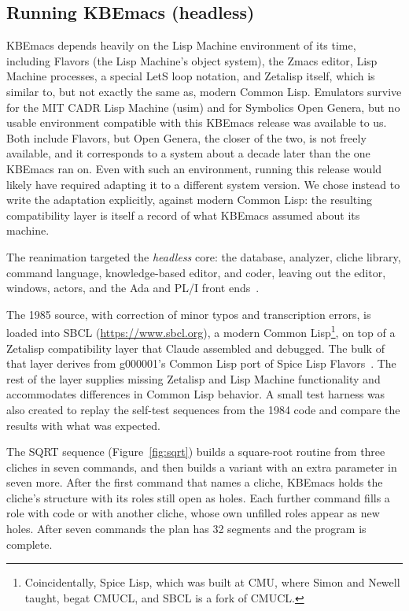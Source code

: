 \documentclass[11pt]{article}
\begin{document}
\subsection{Running KBEmacs (headless)}

KBEmacs depends heavily on the Lisp Machine environment of its time,
including Flavors (the Lisp Machine's object system), the Zmacs
editor, Lisp Machine processes, a special LetS loop notation, and
Zetalisp itself, which is similar to, but not exactly the same as,
modern Common Lisp. Emulators survive for the MIT CADR Lisp Machine
(usim) and for Symbolics Open Genera, but no usable environment
compatible with this KBEmacs release was
available to us. Both include Flavors, but Open Genera, the closer of
the two, is not freely available, and it corresponds to a system
about a decade later than the one KBEmacs ran on.
Even with such an environment, running this release would likely have
required adapting it to a different system version. We chose instead
to write the adaptation explicitly, against modern Common Lisp: the
resulting compatibility layer is itself a record of what KBEmacs
assumed about its machine.

The reanimation targeted the \emph{headless} core: the database,
analyzer, cliche library, command language, knowledge-based editor,
and coder, leaving out the editor, windows, actors, and the Ada and PL/I
front ends~\cite{kbemacsrepo}.

The 1985 source, with correction of minor typos and transcription
errors, is loaded into SBCL (\url{https://www.sbcl.org}), a modern
Common Lisp\footnote{Coincidentally, Spice Lisp, which was built at
CMU, where Simon and Newell taught, begat CMUCL, and SBCL is a fork of
CMUCL.}, on top of a Zetalisp compatibility layer that Claude
assembled and debugged. The bulk of that layer derives from g000001's
Common Lisp port of Spice Lisp Flavors~\cite{g000001}. The rest of the
layer supplies missing Zetalisp and Lisp Machine functionality and
accommodates differences in Common Lisp behavior. A small test harness was also created
to replay the self-test sequences from the 1984 code and compare the
results with what was expected.

The SQRT sequence (Figure~\ref{fig:sqrt}) builds a square-root routine
from three cliches in seven commands, and then builds a variant with
an extra parameter in seven more. After the first command that names a
cliche, KBEmacs holds the cliche's structure with its roles still
open as holes. Each further command fills a role with code or with
another cliche, whose own unfilled roles appear as new holes. After
seven commands the plan has 32 segments and the program is complete.
\end{document}
